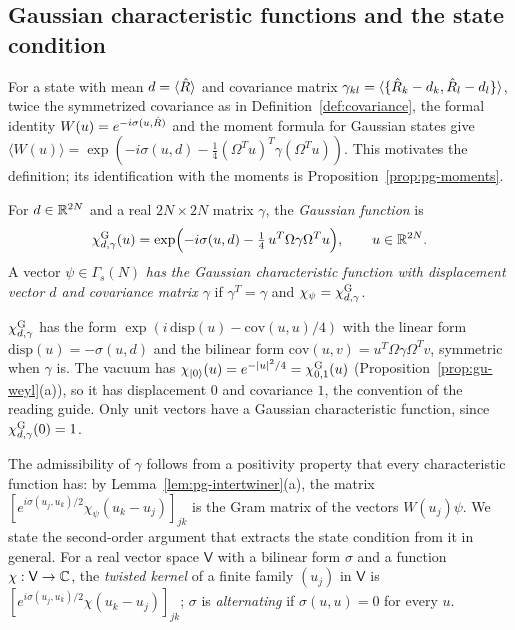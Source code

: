 \begin{veteenv}
\subsection{Gaussian characteristic functions and the state condition}\label{sec:pg-gauss}

For a state with mean $d=\langle\hat R\rangle$ and covariance matrix $\gamma_{kl}=\langle\{\hat R_k-d_k,\hat R_l-d_l\}\rangle$, twice the symmetrized
covariance as in Definition~\ref{def:covariance}, the formal identity $W(u)=e^{-i\sigma(u,\hat R)}$ and the moment formula for Gaussian
states give $\langle W(u)\rangle=\exp(-i\sigma(u,d)-\frac14(\Omega^Tu)^T\gamma(\Omega^Tu))$. This motivates the definition; its
identification with the moments is Proposition~\ref{prop:pg-moments}.

\begin{definition}\label{def:pg-gauss}
For $d\in\mathbb R^{2N}$ and a real $2N\times2N$ matrix $\gamma$, the \emph{Gaussian function} is
\[
 \chi^{\mathrm G}_{d,\gamma}(u)=\exp\Bigl(-i\sigma(u,d)-\tfrac14\,u^T\Omega\gamma\Omega^Tu\Bigr),\qquad u\in\mathbb R^{2N}.
\]
A vector $\psi\in\Gamma_s(N)$ \emph{has the Gaussian characteristic function with displacement vector $d$ and covariance matrix $\gamma$} if
$\gamma^T=\gamma$ and $\chi_\psi=\chi^{\mathrm G}_{d,\gamma}$.
\end{definition}

$\chi^{\mathrm G}_{d,\gamma}$ has the form $\exp(i\,\mathrm{disp}(u)-\mathrm{cov}(u,u)/4)$ with the linear form $\mathrm{disp}(u)=-\sigma(u,d)$ and the
bilinear form $\mathrm{cov}(u,v)=u^T\Omega\gamma\Omega^Tv$, symmetric when $\gamma$ is. The vacuum has $\chi_{\lvert 0\rangle}(u)=e^{-\lvert u\rvert^2/4}=
\chi^{\mathrm G}_{0,1}(u)$ (Proposition~\ref{prop:gu-weyl}(a)), so it has displacement $0$ and covariance $1$, the convention of the reading guide.
Only unit vectors have a Gaussian characteristic function, since $\chi^{\mathrm G}_{d,\gamma}(0)=1$.

The admissibility of $\gamma$ follows from a positivity property that every characteristic function has: by
Lemma~\ref{lem:pg-intertwiner}(a), the matrix $[e^{i\sigma(u_j,u_k)/2}\chi_\psi(u_k-u_j)]_{jk}$ is the Gram matrix of the vectors $W(u_j)\psi$.
We state the second-order argument that extracts the state condition from it in general. For a real vector space $\mathsf V$ with a
bilinear form $\sigma$ and a function $\chi:\mathsf V\to\mathbb C$, the \emph{twisted kernel} of a finite family $(u_j)$ in $\mathsf V$ is
$[e^{i\sigma(u_j,u_k)/2}\chi(u_k-u_j)]_{jk}$; $\sigma$ is \emph{alternating} if $\sigma(u,u)=0$ for every $u$.


\end{veteenv}
